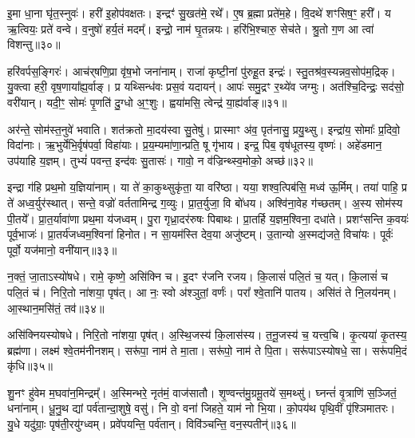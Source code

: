 इ॒मा धा॒ना घृ॑त॒स्नुवः॑।
हरी॑ इ॒होप॑वक्षतः।
इन्द्रꣳ॑ सु॒खत॑मे॒ रथे᳚।
ए॒ष ब्र॒ह्मा प्रते॑म॒हे।
वि॒दथे॑ शꣳसिष॒ꣳ॒ हरी᳚।
य ऋ॒त्वियः॒ प्रते॑ वन्वे।
व॒नुषो॑ हर्य॒तं मदम्᳚।
इन्द्रो॒ नाम॑ घृ॒तन्नयः।
हरि॑भि॒श्चारु॒ सेच॑ते।
श्रु॒तो ग॒ण आ त्वा॑ विशन्तु॥३०॥

हरि॑वर्पस॒ङ्गिरः॑।
आच॑र्‌\mbox{}षणि॒प्रा वृ॑ष॒भो जना॑नाम्।
राजा॑ कृष्टी॒नां पु॑रुहू॒त इन्द्रः॑।
स्तु॒तश्र॑व॒स्यन्नव॒सोप॑म॒द्रिक्।
यु॒क्त्वा हरी॒ वृष॒णाया᳚ह्य॒र्वाङ्।
प्र यथ्सिन्ध॑वः प्रस॒वं यदायन्॑।
आपः॑ समु॒द्रꣳ र॒थ्ये॑व जग्मुः।
अत॑श्चि॒दिन्द्रः॒ सद॑सो॒ वरी॑यान्।
यदी॒ꣳ॒ सोमः॑ पृ॒णति॑ दु॒ग्धो अ॒ꣳ॒शुः।
ह्वया॑मसि॒ त्वेन्द्र॑ या॒ह्य॑र्वाङ्॥३१॥

अर॑न्ते॒ सोम॑स्त॒नुवे॑ भवाति।
शत॑क्रतो मा॒दय॑स्वा सु॒तेषु॑।
प्रास्माꣳ अ॑व॒ पृत॑नासु॒ प्रयु॒थ्सु।
इन्द्रा॑य॒ सोमाः᳚ प्र॒दिवो॒ विदा॑नाः।
ऋ॒भुर्येभि॒र्वृष॑पर्वा॒ विहा॑याः।
प्र॒य॒म्यमा॑णा॒न्प्रति॒ षू गृ॑भाय।
इन्द्र॒ पिब॒ वृष॑धूतस्य॒ वृष्णः॑।
अहे॑डमान॒ उप॑याहि य॒ज्ञम्।
तुभ्यं॑ पवन्त॒ इन्द॑वः सु॒तासः॑।
गावो॒ न व॑ज्रिन्थ्स्व॒मोको॒ अच्छ॑॥३२॥

इन्द्रा ग॑हि प्रथ॒मो य॒ज्ञिया॑नाम्।
या ते॑ का॒कुथ्सुकृ॑ता॒ या वरि॑ष्ठा।
यया॒ शश्व॒त्पिब॑सि॒ मध्व॑ ऊ॒र्मिम्।
तया॑ पाहि॒ प्र ते॑ अध्व॒र्युर॑स्थात्।
सन्ते॒ वज्रो॑ वर्ततामिन्द्र ग॒व्युः।
प्रा॒त॒र्युजा॒ वि बो॑धय।
अश्वि॑ना॒वेह ग॑च्छतम्।
अ॒स्य सोम॑स्य पी॒तये᳚।
प्रा॒त॒र्यावा॑णा प्रथ॒मा य॑जध्वम्।
पु॒रा गृध्रा॒दर॑रुषः पिबाथः।
प्रा॒तर्\mbox{}हि य॒ज्ञम॒श्विना॒ दधा॑ते।
प्रशꣳ॑सन्ति क॒वयः॑ पूर्व॒भाजः॑।
प्रा॒तर्य॑जध्वम॒श्विना॑ हिनोत।
न सा॒यम॑स्ति देव॒या अजु॑ष्टम्।
उ॒तान्यो अ॒स्मद्य॑जते॒ विचा॑यः।
पूर्वः॑ पूर्वो॒ यज॑मानो॒ वनी॑यान्॥३३॥\anuvakamend[चा॒श्व॒जिद्यो ग॑च्छतं नो॒ दाश॒न्नामा॑भि॒श्रीर्ग॑मेम स॒प्रथा॑ भजामहे विशन्तु या॒ह्य॑र्वाङच्छ॑ पिबाथः॒ षट्च॑]

न॒क्तं॒ जा॒ता\-ऽस्यो॑षधे।
रामे॒ कृष्णे॒ असि॑क्नि च।
इ॒दꣳ र॑जनि रजय।
कि॒लासं॑ पलि॒तं च॒ यत्।
कि॒लासं॑ च पलि॒तं च॑।
निरि॒तो ना॑शया॒ पृष॑त्।
आ नः॒ स्वो अ॑श्ञुतां॒ वर्णः॑।
परा᳚ श्वे॒तानि॑ पातय।
असि॑तं ते नि॒लय॑नम्।
आ॒स्थान॒मसि॑तं॒ तव॑॥३४॥

असि॑क्नियस्योषधे।
निरि॒तो ना॑शया॒ पृष॑त्।
अ॒स्थि॒जस्य॑ कि॒लास॑स्य।
त॒नू॒जस्य॑ च॒ यत्त्व॒चि।
कृ॒त्यया॑ कृ॒तस्य॒ ब्रह्म॑णा।
लक्ष्म॑ श्वे॒तम॑नीनशम्।
सरू॑पा॒ नाम॑ ते मा॒ता।
सरू॑पो॒ नाम॑ ते पि॒ता।
सरू॑पा\-ऽस्योषधे॒ सा।
सरू॑पमि॒दं कृ॑धि॥३५॥

शु॒नꣳ हु॑वेम म॒घवा॑न॒मिन्द्रम्᳚।
अ॒स्मिन्भरे॒ नृत॑मं॒ वाज॑सातौ।
शृ॒ण्वन्त॑मु॒ग्रमू॒तये॑ स॒मथ्सु॑।
घ्नन्तं॑ वृ॒त्राणि॑ स॒ञ्जितं॒ धना॑नाम्।
धू॒नु॒थ द्यां पर्व॑तान्दा॒शुषे॒ वसु॑।
नि वो॒ वना॑ जिहते॒ याम॑ नो भि॒या।
को॒पय॑थ पृथि॒वीं पृ॑श्ञिमातरः।
यु॒धे यदु॑ग्राः॒ पृष॑ती॒रयु॑ग्ध्वम्।
प्रवे॑पयन्ति॒ पर्व॑तान्।
विवि॑ञ्चन्ति॒ वन॒स्पतीन्॑॥३६॥

